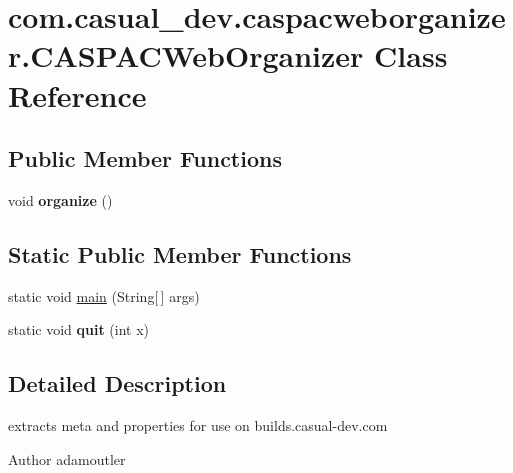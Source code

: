 \hypertarget{classcom_1_1casual__dev_1_1caspacweborganizer_1_1_c_a_s_p_a_c_web_organizer}{\section{com.\-casual\-\_\-dev.\-caspacweborganizer.\-C\-A\-S\-P\-A\-C\-Web\-Organizer Class Reference}
\label{classcom_1_1casual__dev_1_1caspacweborganizer_1_1_c_a_s_p_a_c_web_organizer}
}
\subsection*{Public Member Functions}
\begin{DoxyCompactItemize}
\item 
\hypertarget{classcom_1_1casual__dev_1_1caspacweborganizer_1_1_c_a_s_p_a_c_web_organizer_a10d6e72c5f9e122b7f450926d2013e02}{void {\bfseries organize} ()}\label{classcom_1_1casual__dev_1_1caspacweborganizer_1_1_c_a_s_p_a_c_web_organizer_a10d6e72c5f9e122b7f450926d2013e02}

\end{DoxyCompactItemize}
\subsection*{Static Public Member Functions}
\begin{DoxyCompactItemize}
\item 
static void \hyperlink{classcom_1_1casual__dev_1_1caspacweborganizer_1_1_c_a_s_p_a_c_web_organizer_a5316f4c9771ba66c2af7b530cbe2615c}{main} (String\mbox{[}$\,$\mbox{]} args)
\item 
\hypertarget{classcom_1_1casual__dev_1_1caspacweborganizer_1_1_c_a_s_p_a_c_web_organizer_a3d088bcd380d47ba24e6902493367841}{static void {\bfseries quit} (int x)}\label{classcom_1_1casual__dev_1_1caspacweborganizer_1_1_c_a_s_p_a_c_web_organizer_a3d088bcd380d47ba24e6902493367841}

\end{DoxyCompactItemize}


\subsection{Detailed Description}
extracts meta and properties for use on builds.\-casual-\/dev.\-com

\begin{DoxyAuthor}{Author}
adamoutler 
\end{DoxyAuthor}


